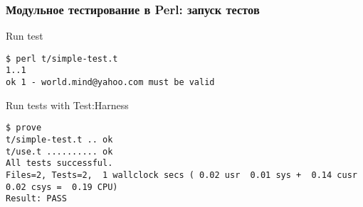 \documentclass{beamer}
\begin{document}
\begin{frame}[fragile]
\frametitle{Модульное тестирование в Perl: запуск тестов}
\begin{block}{Run test}
\begin{verbatim}
$ perl t/simple-test.t
1..1
ok 1 - world.mind@yahoo.com must be valid
\end{verbatim}
\end{block}
\begin{block}{Run tests with Test:Harness}
\begin{verbatim}
$ prove
t/simple-test.t .. ok   
t/use.t .......... ok   
All tests successful.
Files=2, Tests=2,  1 wallclock secs ( 0.02 usr  0.01 sys +  0.14 cusr  0.02 csys =  0.19 CPU)
Result: PASS
\end{verbatim}
\end{block}
\end{frame}

\begin{frame}
\end{frame}

\begin{frame}
\end{frame}

\begin{frame}
\end{frame}

\begin{frame}
\end{frame}

\begin{frame}
\end{frame}

\begin{frame}
\end{frame}
\end{document}
